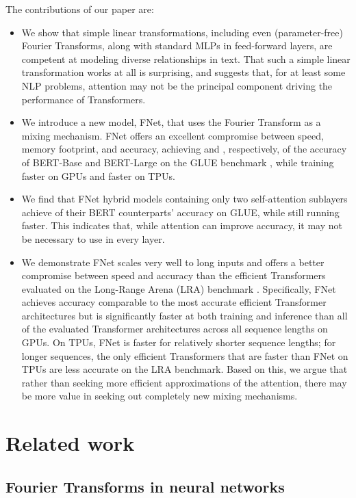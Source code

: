 \documentclass[11pt]{article}
\begin{document}
The contributions of our paper are:
\begin{itemize}
    \item We show that simple linear transformations, including even (parameter-free) Fourier Transforms, along with standard MLPs in feed-forward layers, are competent at modeling diverse relationships in text. That such a simple linear transformation works at all is surprising, and suggests that, for at least some NLP problems, attention may not be the principal component driving the performance of Transformers.
    \item We introduce a new model, FNet, that uses the Fourier Transform as a mixing mechanism.  FNet offers an excellent compromise between speed, memory footprint, and accuracy, achieving  and , respectively, of the accuracy of BERT-Base and BERT-Large \citep{devlin2018bert} on the GLUE benchmark \citep{wang2018glue}, while training  faster on GPUs and  faster on TPUs. 
    \item We find that FNet hybrid models containing only two self-attention sublayers achieve  of their BERT counterparts' accuracy on GLUE, while still running  faster. This indicates that, while attention can improve accuracy, it may not be necessary to use in every layer.
    \item We demonstrate FNet scales very well to long inputs and offers a better compromise between speed and accuracy than the efficient Transformers evaluated on the Long-Range Arena (LRA) benchmark \citep{tay2020long}.
    Specifically, FNet achieves accuracy comparable to the most accurate efficient Transformer architectures but is significantly faster at both training and inference than all of the evaluated Transformer architectures across all sequence lengths on GPUs. On TPUs, FNet is faster for relatively shorter sequence lengths; for longer sequences, the only efficient Transformers that are faster than FNet on TPUs are less accurate on the LRA benchmark.
    Based on this, we argue that rather than seeking more efficient approximations of the attention, there may be more value in seeking out completely new mixing mechanisms.
\end{itemize}
 \section{Related work}
\label{sec:related_work}

\subsection{Fourier Transforms in neural networks}
\label{subsec:fourier_transforms_neural_networks}
\end{document}
